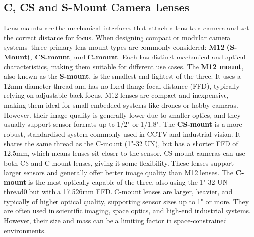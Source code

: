 \subsection{C, CS and S-Mount Camera Lenses}
Lens mounts are the mechanical interfaces that attach a lens to a camera and set the correct distance for focus. When designing compact or modular camera systems, three primary lens mount types are commonly considered: \textbf{M12 (S-Mount), CS-mount}, and \textbf{C-mount}. Each has distinct mechanical and optical characteristics, making them suitable for different use cases.
\nl
The \textbf{M12 mount}, also known as the \textbf{S-mount}, is the smallest and lightest of the three. It uses a 12mm diameter thread and has no fixed flange focal distance (FFD), typically relying on adjustable back-focus. M12 lenses are compact and inexpensive, making them ideal for small embedded systems like drones or hobby cameras. However, their image quality is generally lower due to smaller optics, and they usually support sensor formats up to 1/2" or 1/1.8".
\nl
The \textbf{CS-mount} is a more robust, standardised system commonly used in CCTV and industrial vision. It shares the same thread as the C-mount (1"-32 UN), but has a shorter FFD of 12.5mm, which means lenses sit closer to the sensor. CS-mount cameras can use both CS and C-mount lenses, giving it some flexibility. These lenses support larger sensors and generally offer better image quality than M12 lenses.
\nl
The \textbf{C-mount} is the most optically capable of the three, also using the 1"-32 UN thread0 but with a 17.526mm FFD. C-mount lenses are larger, heavier, and typically of higher optical quality, supporting sensor sizes up to 1" or more. They are often used in scientific imaging, space optics, and high-end industrial systems. However, their size and mass can be a limiting factor in space-constrained environments.

